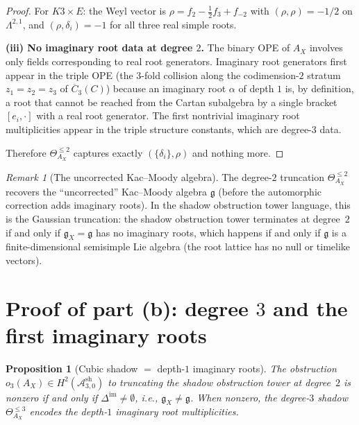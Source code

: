 \documentclass[11pt]{amsart}
\newtheorem{proposition}[theorem]{Proposition}
\theoremstyle{definition}
\theoremstyle{remark}
\newtheorem{remark}[theorem]{Remark}
\newcommand{\cA}{\mathcal{A}}
\newcommand{\fg}{\mathfrak{g}}
\begin{document}
\begin{proof}
For $K3 \times E$: the Weyl vector is
$\rho = f_2 - \tfrac{1}{2}f_3 + f_{-2}$ with
$(\rho, \rho) = -1/2$ on $\Lambda^{2,1}$, and
$(\rho, \delta_i) = -1$ for all three real simple roots.

\medskip
\noindent\textbf{(iii) No imaginary root data at degree $2$.}
The binary OPE of $A_X$ involves only fields corresponding to
real root generators. Imaginary root generators first appear in
the triple OPE (the $3$-fold collision along the codimension-$2$
stratum $z_1 = z_2 = z_3$ of $\overline{C}_3(C)$) because
an imaginary root $\alpha$ of depth $1$ is, by definition, a root
that cannot be reached from the Cartan subalgebra by a single
bracket $[e_i, \cdot]$ with a real root generator. The first
nontrivial imaginary root multiplicities appear in the triple
structure constants, which are degree-$3$ data.

Therefore $\Theta^{\leq 2}_{A_X}$ captures exactly
$(\{\delta_i\}, \rho)$ and nothing more.
\end{proof}

\begin{remark}[The uncorrected Kac--Moody algebra]
\label{rem:uncorrected-km}
The degree-$2$ truncation $\Theta^{\leq 2}_{A_X}$ recovers the
``uncorrected'' Kac--Moody algebra $\fg$ (before the automorphic
correction adds imaginary roots). In the shadow obstruction tower language,
this is the Gaussian truncation: the shadow obstruction tower terminates at
degree~$2$ if and only if $\fg_X = \fg$ has no imaginary roots,
which happens if and only if $\fg$ is a finite-dimensional
semisimple Lie algebra (the root lattice has no null or timelike
vectors).
\end{remark}

\section{Proof of part (b): degree $3$ and the first imaginary
roots}\label{sec:proof-b}

\begin{proposition}[Cubic shadow $=$ depth-$1$ imaginary roots]
\label{prop:degree-3}
The obstruction $o_3(A_X) \in H^2(\cA^{\mathrm{sh}}_{3,0})$ to
truncating the shadow obstruction tower at degree~$2$ is nonzero if and only
if $\Delta^{\mathrm{im}} \neq \emptyset$, i.e., $\fg_X \neq \fg$.
When nonzero, the degree-$3$ shadow $\Theta^{\leq 3}_{A_X}$
encodes the depth-$1$ imaginary root multiplicities.
\end{proposition}
\end{document}
